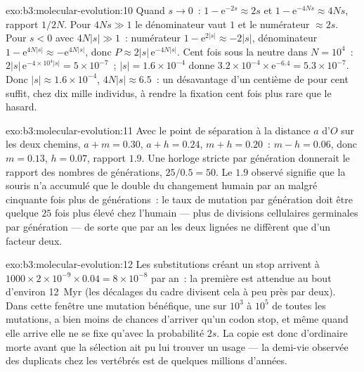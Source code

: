 \begin{solution}{exo:b3:molecular-evolution:10}
Quand $s \to 0$~: $1 - \mathrm{e}^{-2s} \approx 2s$ et $1 - \mathrm{e}^{-4Ns}
\approx 4Ns$, rapport $1/2N$. Pour $4Ns \gg 1$ le dénominateur vaut $1$ et
le numérateur $\approx 2s$. Pour $s < 0$ avec $4N|s| \gg 1$~: numérateur $1 -
\mathrm{e}^{2|s|} \approx -2|s|$, dénominateur $1 - \mathrm{e}^{4N|s|} \approx
-\mathrm{e}^{4N|s|}$, donc $P \approx 2|s|\,\mathrm{e}^{-4N|s|}$. Cent fois
sous la neutre dans $N = 10^{4}$~: $2|s|\,\mathrm{e}^{-4\times 10^{4}|s|} =
5\times 10^{-7}$~; $|s| = 1.6\times 10^{-4}$ donne $3.2\times 10^{-4}\times
\mathrm{e}^{-6.4} = 5.3\times 10^{-7}$. Donc $|s| \approx 1.6\times 10^{-4}$,
$4N|s| \approx 6.5$~: un désavantage d'un centième de pour cent suffit,
chez dix mille individus, à rendre la fixation cent fois plus rare que
le hasard.
\end{solution}

\begin{solution}{exo:b3:molecular-evolution:11}
Avec le point de séparation à la distance $a$ d'$O$ sur les deux
chemins, $a + m =
0.30$, $a + h = 0.24$, $m + h = 0.20$~: $m - h = 0.06$, donc $m = 0.13$, $h
= 0.07$, rapport $1.9$. Une horloge stricte par génération donnerait le
rapport des nombres de générations, $25/0.5 = 50$. Le $1.9$ observé
signifie que la souris n'a accumulé que le double du changement humain
par an malgré cinquante fois plus de générations~: le taux de mutation
par génération doit être quelque $25$ fois plus élevé chez l'humain ---
plus de divisions cellulaires germinales par génération --- de sorte que
par an les deux lignées ne diffèrent que d'un facteur deux.
\end{solution}

\begin{solution}{exo:b3:molecular-evolution:12}
Les substitutions créant un stop arrivent à $1000\times 2\times 10^{-9}\times
0.04 = 8\times 10^{-8}$ par an~: la première est attendue au bout
d'environ \qty{12}{Myr} (les décalages du cadre divisent cela à peu près
par deux). Dans cette fenêtre une mutation bénéfique, une sur $10^{3}$ à
$10^{5}$ de toutes les mutations, a bien moins de chances d'arriver
qu'un codon stop, et même quand elle arrive elle ne se fixe qu'avec la
probabilité $2s$. La copie est donc d'ordinaire morte avant que la
sélection ait pu lui trouver un usage --- la demi-vie observée des
duplicats chez les vertébrés est de quelques millions d'années.
\end{solution}

